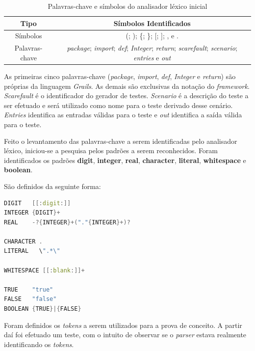 \begin{table}[h]
  \tiny
  \centering
  \caption{Palavras-chave e símbolos do analisador léxico inicial}
  \label{keywords}
  \begin{tabular}{| c | c |}
    \hline
    Tipo & Símbolos Identificados\\ \hline
     Símbolos & (;  );  \{;  \};  [;  ];  , e . \\
     Palavras-chave &   \textit{package}; \textit{import}; \textit{def}; \textit{Integer}; \textit{return}; \textit{scarefault}; \textit{scenario}; \textit{entries} e \textit{out} \\ \hline
  \end{tabular}
\end{table}
\par
\indent As primeiras cinco palavras-chave (\textit{package}, \textit{import}, \textit{def}, \textit{Integer} e \textit{return}) são próprias da linguagem \textit{Grails}. As demais são exclusivas da notação do \textit{framework}. \textit{Scarefault} é o identificador do gerador de testes. \textit{Scenario} é a descrição do teste a ser efetuado e será utilizado como nome para o teste derivado desse cenário. \textit{Entries} identifica as entradas válidas para o teste e \textit{out} identifica a saída válida para o teste.
\par
\indent Feito o levantamento das palavras-chave a serem identificadas pelo analisador léxico, iniciou-se a pesquisa pelos padrões a serem reconhecidos. Foram identificados os padrões \textbf{digit}, \textbf{integer}, \textbf{real}, \textbf{character}, \textbf{literal}, \textbf{whitespace} e \textbf{boolean}.
\par
\indent São definidos da seguinte forma:
\begin{lstlisting}[language=C++, label=pattern-nominate, caption=Padrões Nominados]
DIGIT   [[:digit:]]
INTEGER {DIGIT}+
REAL    -?{INTEGER}+("."{INTEGER}+)?

CHARACTER .
LITERAL   \".*\"

WHITESPACE [[:blank:]]+

TRUE    "true"
FALSE   "false"
BOOLEAN {TRUE}|{FALSE}
\end{lstlisting}
\par
\indent Foram definidos os \textit{tokens} a serem utilizados para a prova de conceito. A partir daí foi efetuado um teste, com o intuito de observar se o \textit{parser} estava realmente identificando os \textit{tokens}.
\par
